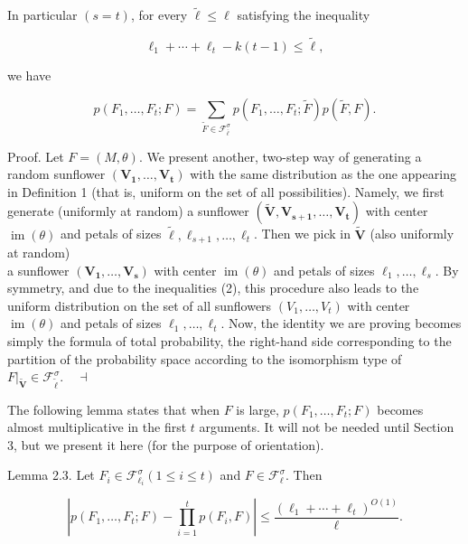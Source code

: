 \documentclass[10pt]{article}
\begin{document}
In particular $(s=t)$, for every $\tilde{\ell} \leq \ell$ satisfying the inequality

$$
\ell_{1}+\cdots+\ell_{t}-k(t-1) \leq \tilde{\ell},
$$

we have


\begin{equation*}
p\left(F_{1}, \ldots, F_{t} ; F\right)=\sum_{\widetilde{F} \in \mathcal{F}_{\bar{\ell}}^{\sigma}} p\left(F_{1}, \ldots, F_{t} ; \widetilde{F}\right) p(\widetilde{F}, F) . \tag{3}
\end{equation*}


Proof. Let $F=(M, \theta)$. We present another, two-step way of generating a random sunflower $\left(\boldsymbol{V}_{\mathbf{1}}, \ldots, \boldsymbol{V}_{\boldsymbol{t}}\right)$ with the same distribution as the one appearing in Definition 1 (that is, uniform on the set of all possibilities). Namely, we first generate (uniformly at random) a sunflower $\left(\widetilde{\boldsymbol{V}}, \boldsymbol{V}_{\boldsymbol{s}+\mathbf{1}}, \ldots, \boldsymbol{V}_{\boldsymbol{t}}\right)$ with center $\operatorname{im}(\theta)$ and petals of sizes $\tilde{\ell}, \ell_{s+1}, \ldots, \ell_{t}$. Then we pick in $\tilde{\boldsymbol{V}}$ (also uniformly at random)\\
a sunflower $\left(\boldsymbol{V}_{\mathbf{1}}, \ldots, \boldsymbol{V}_{\boldsymbol{s}}\right)$ with center $\operatorname{im}(\theta)$ and petals of sizes $\ell_{1}, \ldots, \ell_{s}$. By symmetry, and due to the inequalities (2), this procedure also leads to the uniform distribution on the set of all sunflowers $\left(V_{1}, \ldots, V_{t}\right)$ with center $\operatorname{im}(\theta)$ and petals of sizes $\ell_{1}, \ldots, \ell_{t}$. Now, the identity we are proving becomes simply the formula of total probability, the right-hand side corresponding to the partition of the probability space according to the isomorphism type of $\left.F\right|_{\tilde{\boldsymbol{V}}} \in \mathcal{F}_{\tilde{\ell}}^{\sigma} . \quad \dashv$

The following lemma states that when $F$ is large, $p\left(F_{1}, \ldots, F_{t} ; F\right)$ becomes almost multiplicative in the first $t$ arguments. It will not be needed until Section 3, but we present it here (for the purpose of orientation).

Lemma 2.3. Let $F_{i} \in \mathcal{F}_{\ell_{i}}^{\sigma}(1 \leq i \leq t)$ and $F \in \mathcal{F}_{\ell}^{\sigma}$. Then

$$
\left|p\left(F_{1}, \ldots, F_{t} ; F\right)-\prod_{i=1}^{t} p\left(F_{i}, F\right)\right| \leq \frac{\left(\ell_{1}+\cdots+\ell_{t}\right)^{O(1)}}{\ell} .
$$
\end{document}
